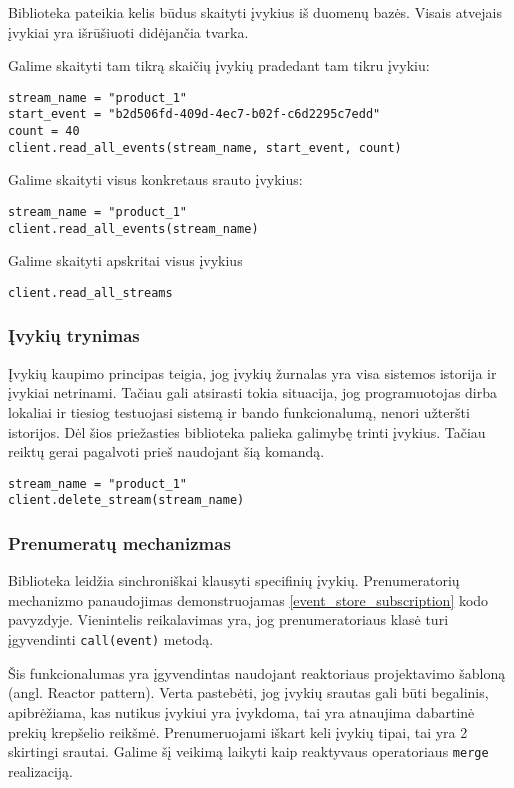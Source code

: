 Biblioteka pateikia kelis būdus skaityti įvykius iš duomenų bazės. Visais atvejais įvykiai yra išrūšiuoti didėjančia tvarka.

Galime skaityti tam tikrą skaičių įvykių pradedant tam tikru įvykiu:

\begin{lstlisting}[]
stream_name = "product_1" 
start_event = "b2d506fd-409d-4ec7-b02f-c6d2295c7edd"
count = 40
client.read_all_events(stream_name, start_event, count)
\end{lstlisting}

Galime skaityti visus konkretaus srauto įvykius:

\begin{lstlisting}[]
stream_name = "product_1" 
client.read_all_events(stream_name)
\end{lstlisting}

Galime skaityti apskritai visus įvykius

\begin{lstlisting}[]
client.read_all_streams
\end{lstlisting}

\subsubsection{Įvykių trynimas}

Įvykių kaupimo principas teigia, jog įvykių žurnalas yra visa sistemos istorija ir įvykiai netrinami. Tačiau gali atsirasti tokia situacija, jog programuotojas dirba lokaliai ir tiesiog testuojasi sistemą ir bando funkcionalumą, nenori užteršti istorijos. Dėl šios priežasties biblioteka palieka galimybę trinti įvykius. Tačiau reiktų gerai pagalvoti prieš naudojant šią komandą.

\begin{lstlisting}
stream_name = "product_1"
client.delete_stream(stream_name)
\end{lstlisting}

\subsubsection{Prenumeratų mechanizmas}

Biblioteka leidžia sinchroniškai klausyti specifinių įvykių. Prenumeratorių mechanizmo panaudojimas demonstruojamas \ref{event_store_subscription} kodo pavyzdyje. Vienintelis reikalavimas yra, jog prenumeratoriaus klasė turi įgyvendinti \lstinline|call(event)| metodą.

Šis funkcionalumas yra įgyvendintas naudojant reaktoriaus projektavimo šabloną (angl. Reactor pattern). Verta pastebėti, jog įvykių srautas gali būti begalinis, apibrėžiama, kas nutikus įvykiui yra įvykdoma, tai yra atnaujima dabartinė prekių krepšelio reikšmė. Prenumeruojami iškart keli įvykių tipai, tai yra 2 skirtingi srautai. Galime šį veikimą laikyti kaip reaktyvaus operatoriaus \lstinline|merge| realizaciją.

